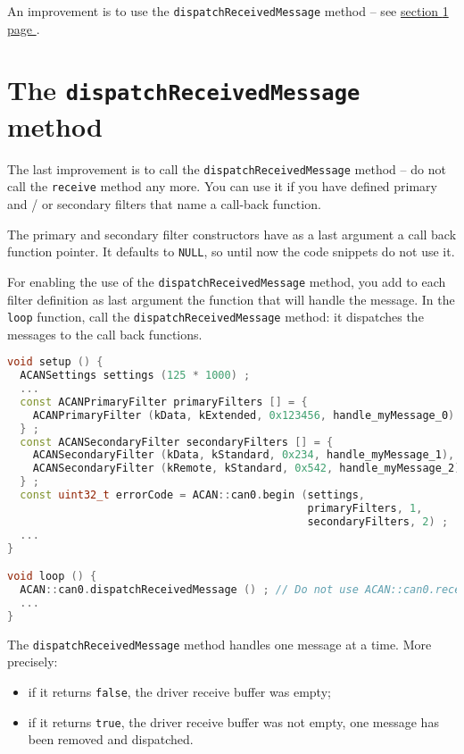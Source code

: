 \documentclass[9pt, a4paper, obeyspaces, openany]{extarticle}
\newcommand \sectionLabel[2]{\section{#1}\label{sec:#2}}
\newcommand\refSectionPage[1]{\hyperref[sec:#1]{section \ref*{sec:#1} page \pageref{sec:#1}}}
\begin{document}
An improvement is to use the \texttt{dispatchReceivedMessage} method -- see \refSectionPage{UsingDispatchMethod}.














\sectionLabel{The \texttt{dispatchReceivedMessage} method}{UsingDispatchMethod}

The last improvement is to call the \texttt{dispatchReceivedMessage} method -- do not call the \texttt{receive} method any more. You can use it if you have defined primary and / or secondary filters that name a call-back function.

The primary and secondary filter constructors have as a last argument a call back function pointer. It defaults to \texttt{NULL}, so until now the code snippets do not  use it.

For enabling the use of the \texttt{dispatchReceivedMessage} method, you add to each filter definition as last argument the function that will handle the message. In the \texttt{loop} function, call the \texttt{dispatchReceivedMessage} method: it dispatches the messages to the call back functions.

{ \small\begin{lstlisting}[language=c++]
void setup () {
  ACANSettings settings (125 * 1000) ;
  ...
  const ACANPrimaryFilter primaryFilters [] = {
    ACANPrimaryFilter (kData, kExtended, 0x123456, handle_myMessage_0)
  } ;
  const ACANSecondaryFilter secondaryFilters [] = {
    ACANSecondaryFilter (kData, kStandard, 0x234, handle_myMessage_1),
    ACANSecondaryFilter (kRemote, kStandard, 0x542, handle_myMessage_2)
  } ;
  const uint32_t errorCode = ACAN::can0.begin (settings,
                                               primaryFilters, 1,
                                               secondaryFilters, 2) ;
  ...
}

void loop () {
  ACAN::can0.dispatchReceivedMessage () ; // Do not use ACAN::can0.receive any more
  ...
}
\end{lstlisting}}

The \texttt{dispatchReceivedMessage} method handles one message at a time. More precisely:
\begin{itemize}
  \item if it returns \texttt{false}, the driver receive buffer was empty;
  \item if it returns \texttt{true}, the driver receive buffer was not empty, one message has been removed and dispatched.
\end{itemize}
\end{document}
